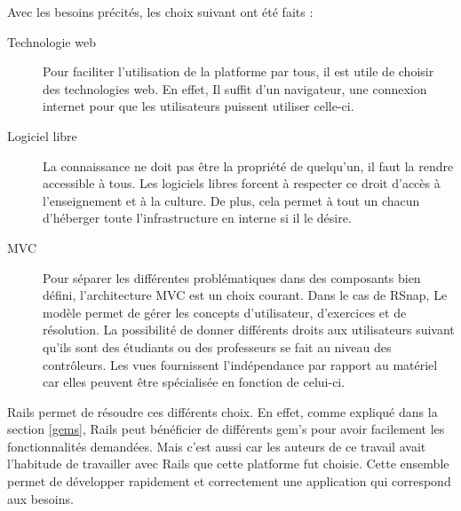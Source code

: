 Avec les besoins précités, les choix suivant ont été faits :
\begin{description}
  \item[Technologie web] Pour faciliter l'utilisation de la platforme par tous, il est utile de choisir des technologies web. En effet, Il suffit d'un navigateur, une connexion internet pour que les utilisateurs puissent utiliser celle-ci.
  \item[Logiciel libre] La connaissance ne doit pas être la propriété de quelqu'un, il faut la rendre accessible à tous. Les logiciels libres forcent à respecter ce droit d'accès à l'enseignement et à la culture. De plus, cela permet à tout un chacun d'héberger toute l'infrastructure en interne si il le désire.
  \item[MVC] Pour séparer les différentes problématiques dans des composants bien défini, l'architecture MVC est un choix courant. Dans le cas de RSnap, Le modèle permet de gérer les concepts d'utilisateur, d'exercices et de résolution. La possibilité de donner différents droits aux utilisateurs suivant qu'ils sont des étudiants ou des professeurs se fait au niveau des contrôleurs. Les vues fournissent l'indépendance par rapport au matériel car elles peuvent être spécialisée en fonction de celui-ci.
\end{description}
Rails permet de résoudre ces différents choix. %
En effet, comme expliqué dans la section \ref{gems}, Rails peut bénéficier de différents gem's pour avoir facilement les fonctionnalités demandées. Mais c'est aussi car les auteurs de ce travail avait l'habitude de travailler avec Rails que cette platforme fut choisie. Cette ensemble permet de développer rapidement et correctement une application qui correspond aux besoins. 


